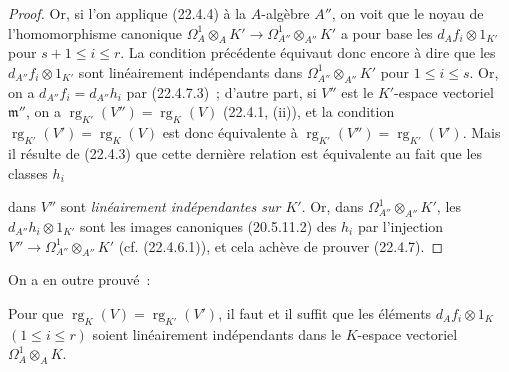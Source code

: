 \begin{proof}
Or, si l'on applique (22.4.4) à la $A$-algèbre $A''$, on voit que le noyau de
l'homomorphisme canonique
$\Omega^1_A\otimes_AK'\longrightarrow\Omega^1_{A''}\otimes_{A''}K'$ a pour
base les $d_Af_i\otimes1_{K'}$ pour $s+1\leqslant i\leqslant r$. La condition
précédente équivaut donc encore à dire que les $d_{A''}f_i\otimes1_{K'}$ sont
linéairement indépendants dans $\Omega^1_{A''}\otimes_{A''}K'$ pour
$1\leqslant i\leqslant s$. Or, on a $d_{A''}f_i=d_{A''}h_i$ par (22.4.7.3)~;
d'autre part, si $V''$ est le $K'$-espace vectoriel $\mathfrak m''$, on a
$\operatorname{rg}_{K'}(V'')=\operatorname{rg}_K(V)$ (22.4.1, (ii)), et la condition
$\operatorname{rg}_{K'}(V')=\operatorname{rg}_K(V)$ est donc équivalente à
$\operatorname{rg}_{K'}(V'')=\operatorname{rg}_{K'}(V')$. Mais il résulte de (22.4.3) que cette dernière
relation est équivalente au fait que les classes $h_i$


dans $V''$ sont \emph{linéairement indépendantes sur $K'$}. Or, dans
$\Omega^1_{A''}\otimes_{A''}K'$, les $d_{A''}h_i\otimes1_{K'}$ sont les images
canoniques (20.5.11.2) des $h_i$ par l'injection
$V''\longrightarrow\Omega^1_{A''}\otimes_{A''}K'$ (cf. (22.4.6.1)), et cela
achève de prouver (22.4.7).
\end{proof}

On a en outre prouvé~:

\begin{corollary}[22.4.7.4]
\label{0.22.4.7.4-fr}
Pour que $\operatorname{rg}_K(V)=\operatorname{rg}_{K'}(V')$, il faut et il suffit que les éléments
$d_Af_i\otimes1_K$ $(1\leqslant i\leqslant r)$ soient linéairement
indépendants dans le $K$-espace vectoriel $\Omega^1_A\otimes_AK$.
\end{corollary}

